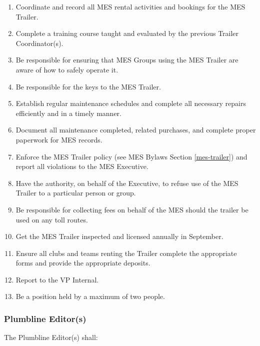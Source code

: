 \begin{enumerate}
 \item
  Coordinate and record all MES rental activities and bookings for the MES Trailer.
 \item
  Complete a training course taught and evaluated by the previous Trailer Coordinator(s).
 \item
  Be responsible for ensuring that MES Groups using the MES Trailer are aware of how to safely operate it.
 \item
  Be responsible for the keys to the MES Trailer. 
 \item
  Establish regular maintenance schedules and complete all necessary repairs efficiently and in a timely manner.
 \item
  Document all maintenance completed, related purchases, and complete proper paperwork for MES records.
 \item
  Enforce the MES Trailer policy (see MES Bylaws Section \ref{mes-trailer}) and report all violations to the MES Executive.
 \item
  Have the authority, on behalf of the Executive, to refuse use of the MES Trailer to a particular person or group.
 \item
  Be responsible for collecting fees on behalf of the MES should the trailer be used on any toll routes.
 \item
  Get the MES Trailer inspected and licensed annually in September.
 \item
  Ensure all clubs and teams renting the Trailer complete the appropriate forms and provide the appropriate deposits.
 \item
  Report to the VP Internal.
 \item
  Be a position held by a maximum of two people.

\end{enumerate}

\subsubsection{Plumbline Editor(s)}
\label{plumbline-editors}
The Plumbline Editor(s) shall:

